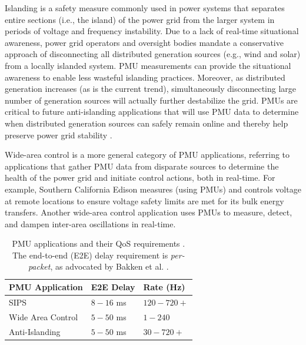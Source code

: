 Islanding is a safety measure commonly used in power systems that separates entire sections (i.e., the island) of the power grid from the larger system in periods of voltage and frequency 
instability.  Due to a lack of real-time situational awareness, power grid operators and oversight bodies mandate a conservative approach of disconnecting all distributed generation sources 
(e.g., wind and solar) from a locally islanded system. PMU measurements can provide the situational awareness to enable less wasteful islanding practices. Moreover,
as distributed generation increases (as is the current trend), simultaneously disconnecting large number of generation sources will actually further destabilize the grid.  
PMUs are critical to future anti-islanding applications that will
use PMU data to determine when distributed generation sources can safely remain online and thereby help preserve power grid stability \cite{Bakken11}.

Wide-area control is a more general category of PMU applications, referring to applications that gather PMU data from disparate sources to determine the health of the power grid 
and initiate control actions, both in real-time.
For example, Southern California Edison \cite{Johnson07} measures (using PMUs) and controls voltage at remote locations to ensure voltage safety limits are met for its bulk energy transfers.
Another wide-area control application uses PMUs to measure, detect, and dampen inter-area oscillations in real-time\cite{Bakken11}.

\begin{table}[t]
\begin{center}
\begin{tabular}{|l|l|l||} 
\hline
   	{\bf PMU Application} & {\bf E2E Delay} & {\bf Rate (Hz)} \\ 
		  \hline \hline
		
			SIPS & $8-16$ ms & $120-720+$ \\ 
			Wide Area Control  & $5-50$ ms & $1-240$ \\
			Anti-Islanding  & $5-50$ ms & $30-720+$  \\
			\hline
			\end{tabular}
			\end{center}
\caption{PMU applications and their QoS requirements \cite{Bakken11}.  The end-to-end (E2E) delay requirement is \emph{per-packet}, as advocated by Bakken et al. \cite{Bakken11}.} 
\label{tab:app-requirements}
\end{table}

